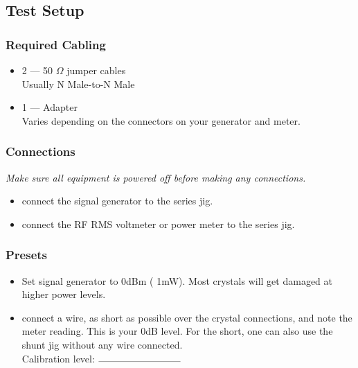 \documentclass[10pt,letterpaper]{book}
\begin{document}
\subsection*{Test Setup}
\subsubsection*{Required Cabling}
\begin{itemize}
	\item 2 --- 50 $\Omega$ jumper cables \\
		Usually N Male-to-N Male
	\item 1 --- Adapter \\
		Varies depending on the connectors on your generator and meter.
\end{itemize}
\subsubsection*{Connections}
\emph{Make sure all equipment is powered off before making any connections.}
\begin{itemize}
\item connect the signal generator to the series jig.
\item connect the RF RMS voltmeter or power meter to the series jig.
\end{itemize}
\subsubsection*{Presets}
\begin{itemize}
\item Set signal generator to 0dBm ( 1mW). Most crystals will get damaged at higher power levels.
\item connect a wire, as short as possible over the crystal connections, and note the meter reading. This is your 0dB level. For the short, one can also use the shunt jig without any wire connected.
	\vspace{30pt}
	 \\Calibration level: $\rule{3cm}{0.1mm}$ 
\end{itemize}
\end{document}
